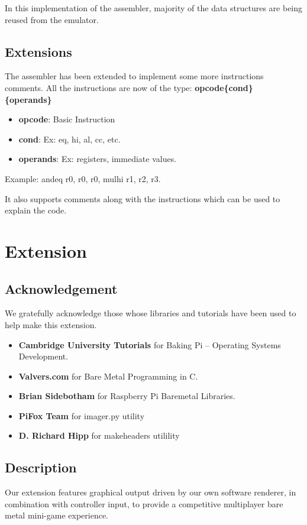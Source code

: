 \documentclass[11pt]{article}
\begin{document}
In this implementation of the assembler, majority of the data structures are
being reused from the emulator.

\subsection{Extensions}

The assembler has been extended to implement some more instructions comments.
All the instructions are now of the type:
\textbf{opcode\{cond\} \{operands\}}
\begin{itemize}[noitemsep,topsep=0pt]
  \item \textbf{opcode}: Basic Instruction
  \item \textbf{cond}: Ex: eq, hi, al, cc, etc.
  \item \textbf{operands}: Ex: registers, immediate values.
\end{itemize}
Example: andeq r0, r0, r0, mulhi r1, r2, r3.

It also supports comments along with the instructions which can be used to
explain the code.

\section{Extension}

\subsection{Acknowledgement}

We gratefully acknowledge those  whose libraries and tutorials have been used 
to help make this extension.

\begin{itemize}[noitemsep,topsep=0pt]
  \item \textbf{Cambridge University Tutorials} for Baking Pi –
    Operating Systems Development.
  \item \textbf{Valvers.com} for Bare Metal Programming in C.
  \item \textbf{Brian Sidebotham} for Raspberry Pi Baremetal Libraries.
  \item \textbf{PiFox Team} for imager.py utility
  \item \textbf{D. Richard Hipp} for makeheaders utilility
\end{itemize}

\subsection{Description}
Our extension features graphical output driven by our own software renderer, 
in combination with controller input, to provide a competitive multiplayer 
bare metal mini-game experience.
\end{document}
